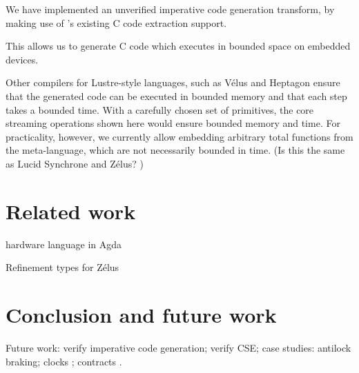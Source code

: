 \documentclass[sigplan,screen]{acmart}
\begin{document}
We have implemented an unverified imperative code generation transform, by making use of \fstar{}'s existing C code extraction support\cite{protzenko2017verified}.

This allows us to generate C code which executes in bounded space on embedded devices.

Other compilers for Lustre-style languages, such as Vélus\cite{bourke2017formally} and Heptagon \cite{gerard2012modular} ensure that the generated code can be executed in bounded memory and that each step takes a bounded time.
With a carefully chosen set of primitives, the core streaming operations shown here would ensure bounded memory and time.
For practicality, however, we currently allow embedding arbitrary total functions from the \fstar{} meta-language, which are not necessarily bounded in time.
(Is this the same as Lucid Synchrone and Zélus? \CITE)

\section{Related work}

hardware language in Agda \cite{harrison2021mechanized}

Refinement types for Zélus \cite{chen2022synchronous}

\section{Conclusion and future work}

Future work: verify imperative code generation; verify CSE; case studies: antilock braking; clocks \cite{caspi1995functional}; contracts \cite{champion2016kind2}.

\pagebreak





\end{document}
